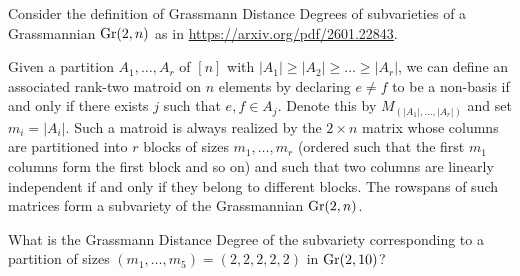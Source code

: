 Consider the definition of Grassmann Distance Degrees of subvarieties of a Grassmannian ${\rm Gr}(2,n)$ as in \href{https://arxiv.org/pdf/2601.22843}{https://arxiv.org/pdf/2601.22843}.

Given a partition $A_1,\dots,A_r$ of $[n]$ with $|A_1| \geq |A_2| \geq \dots \geq |A_r|$, we can define an associated rank-two matroid on $n$ elements by declaring $e\neq f$ to be a non-basis if and only if there exists $j$ such that $e,f \in A_j$. Denote this by $M_{(|A_1|,\dots,|A_r|)}$ and set $m_i = |A_i|$. Such a matroid is always realized by the $2 \times n$ matrix whose columns are partitioned into $r$ blocks of sizes $m_1,\dots,m_r$ (ordered such that the first $m_1$ columns form the first block and so on) and such that two columns are linearly independent if and only if they belong to different blocks. The rowspans of such matrices form a subvariety of the Grassmannian ${\rm Gr}(2,n)$.

What is the Grassmann Distance Degree of the subvariety corresponding to a partition of sizes $(m_1,\dots,m_5) =(2,2,2,2,2)$ in ${\rm Gr}(2,10)$?
